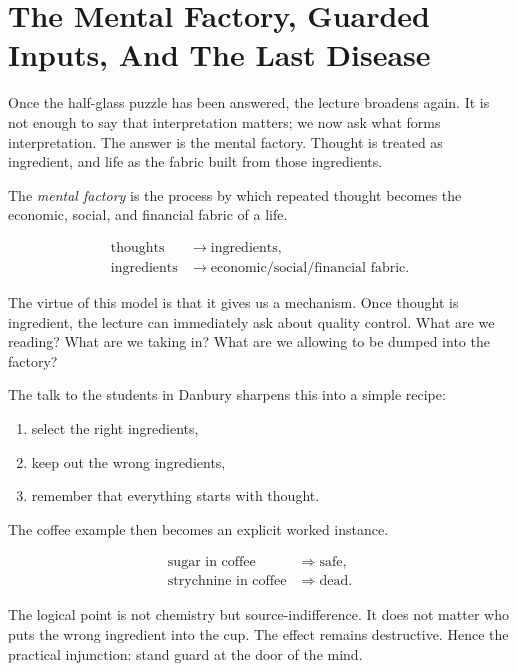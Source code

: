\section{The Mental Factory, Guarded Inputs, And The Last Disease}

Once the half-glass puzzle has been answered, the lecture broadens again. It is not enough to say that interpretation matters; we now ask what forms interpretation. The answer is the mental factory. Thought is treated as ingredient, and life as the fabric built from those ingredients.

\begin{definition}
The \emph{mental factory} is the process by which repeated thought becomes the economic, social, and financial fabric of a life.
\end{definition}

\begin{align}
\text{thoughts} &\rightarrow \text{ingredients},\\
\text{ingredients} &\rightarrow \text{economic/social/financial fabric}.
\end{align}

The virtue of this model is that it gives us a mechanism. Once thought is ingredient, the lecture can immediately ask about quality control. What are we reading? What are we taking in? What are we allowing to be dumped into the factory?

The talk to the students in Danbury sharpens this into a simple recipe:
\begin{enumerate}
\item select the right ingredients,
\item keep out the wrong ingredients,
\item remember that everything starts with thought.
\end{enumerate}

The coffee example then becomes an explicit worked instance.

\begin{align}
\text{sugar in coffee} &\Rightarrow \text{safe},\\
\text{strychnine in coffee} &\Rightarrow \text{dead}.
\end{align}

The logical point is not chemistry but source-indifference. It does not matter who puts the wrong ingredient into the cup. The effect remains destructive. Hence the practical injunction: stand guard at the door of the mind.

